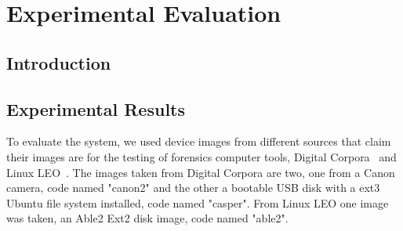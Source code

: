 \chapter{Experimental Evaluation}

\section{Introduction}

\section{Experimental Results}

To evaluate the system, we used device images from different sources that claim their images are for the testing of forensics computer tools, Digital Corpora~\cite{DCorpora} and Linux LEO~\cite{LinuxLEO}. The images taken from Digital Corpora are two, one from a Canon camera, code named "canon2" and the other a bootable USB disk with a ext3 Ubuntu file system installed, code named "casper". From Linux LEO one image was taken, an Able2 Ext2 disk image, code named "able2".

